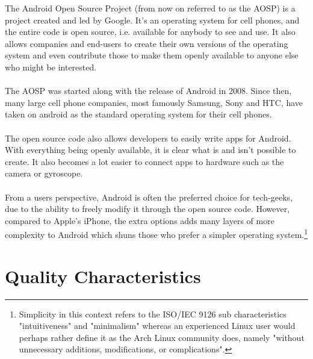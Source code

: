 \documentclass[conference]{IEEEtran}
\begin{document}
The Android Open Source Project (from now on referred to as the AOSP) is a project created and led by Google. It's an operating system for cell phones, and the entire code is open source, i.e. available for anybody to see and use. It also allows companies and end-users to create their own versions of the operating system and even contribute those to make them openly available to anyone else who might be interested.\cite{android} 
\\\\The AOSP was started along with the release of Android in 2008. Since then, many large cell phone companies, most famously Samsung, Sony and HTC, have taken on android as the standard operating system for their cell phones. 
\\\\The open source code also allows developers to easily write apps for Android. With everything being openly available, it is clear what is and isn't possible to create. It also becomes a lot easier to connect apps to hardware such as the camera or gyroscope.
\\\\From a users perspective, Android is often the preferred choice for tech-geeks, due to the ability to freely modify it through the open source code. However, compared to Apple's iPhone, the extra options adds many layers of more complexity to Android which shuns those who prefer a simpler operating system.\footnote{Simplicity in this context refers to the ISO/IEC 9126\cite{jung2004} sub characteristics "intuitiveness" and "minimalism" whereas an experienced Linux user would perhaps rather define it as the Arch Linux community does, namely "without unnecessary additions, modifications, or complications".\cite{archway}} 

\section{Quality Characteristics}
\label{quality}
\end{document}
